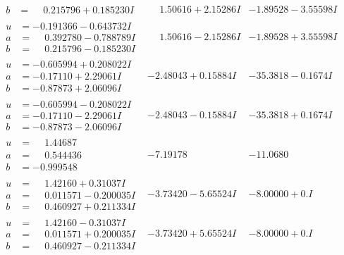 \documentclass[1p]{elsarticle_modified}
\theoremstyle{definition}
\begin{document}
$$\begin{array}{c|c|c}
\begin{aligned}
b &= \phantom{-}0.215796 + 0.185230 I\end{aligned}
 & \phantom{-}1.50616 + 2.15286 I & -1.89528 - 3.55598 I \\ \hline\begin{aligned}
u &= -0.191366 - 0.643732 I \\
a &= \phantom{-}0.392780 - 0.788789 I \\
b &= \phantom{-}0.215796 - 0.185230 I\end{aligned}
 & \phantom{-}1.50616 - 2.15286 I & -1.89528 + 3.55598 I \\ \hline\begin{aligned}
u &= -0.605994 + 0.208022 I \\
a &= -0.17110 + 2.29061 I \\
b &= -0.87873 + 2.06096 I\end{aligned}
 & -2.48043 + 0.15884 I & -35.3818 - 0.1674 I \\ \hline\begin{aligned}
u &= -0.605994 - 0.208022 I \\
a &= -0.17110 - 2.29061 I \\
b &= -0.87873 - 2.06096 I\end{aligned}
 & -2.48043 - 0.15884 I & -35.3818 + 0.1674 I \\ \hline\begin{aligned}
u &= \phantom{-}1.44687\phantom{ +0.000000I} \\
a &= \phantom{-}0.544436\phantom{ +0.000000I} \\
b &= -0.999548\phantom{ +0.000000I}\end{aligned}
 & -7.19178\phantom{ +0.000000I} & -11.0680\phantom{ +0.000000I} \\ \hline\begin{aligned}
u &= \phantom{-}1.42160 + 0.31037 I \\
a &= \phantom{-}0.011571 - 0.200035 I \\
b &= \phantom{-}0.460927 + 0.211334 I\end{aligned}
 & -3.73420 - 5.65524 I & -8.00000 + 0. I\phantom{ +0.000000I} \\ \hline\begin{aligned}
u &= \phantom{-}1.42160 - 0.31037 I \\
a &= \phantom{-}0.011571 + 0.200035 I \\
b &= \phantom{-}0.460927 - 0.211334 I\end{aligned}
 & -3.73420 + 5.65524 I & -8.00000 + 0. I\phantom{ +0.000000I} \\ \hline\begin{aligned}

\end{aligned}
\end{array}$$
\end{document}
